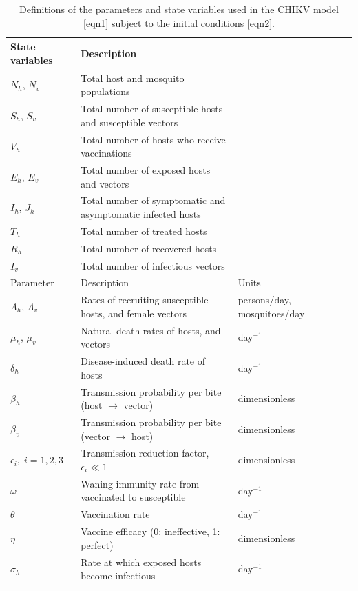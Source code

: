 \documentclass[9pt]{article}
\numberwithin{equation}{section}
\begin{document}
\begin{table}[!ht]
    \caption{Definitions of the parameters and state variables used in the CHIKV model \eqref{eqn1} subject to the initial conditions \eqref{eqn2}.}
    \label{table1}
    \begin{tabular}{lllll@{}}
        \toprule
        State variables& Description\\
        \midrule
        $N_h$, $N_v$ & Total host and mosquito populations \\
        $S_h$, $S_v$ & Total number of susceptible hosts and susceptible vectors \\
        $V_h$ & Total number of hosts who receive vaccinations \\
        $E_h$, $E_v$ & Total number of exposed hosts and vectors\\
        $I_h$, $J_h$ & Total number of symptomatic and asymptomatic infected hosts\\
        $T_h$ & Total number of treated hosts \\
        $R_h$ & Total number of recovered hosts \\
        $I_v$ & Total number of infectious vectors\\
        \midrule
        Parameter& Description& Units\\
        \midrule
        $\Lambda_h$, $\Lambda_v$ & Rates of recruiting susceptible hosts, and female vectors &persons/day, mosquitoes/day\\
        $\mu_h$, $\mu_v$ & Natural death rates of hosts, and vectors& day$^{-1}$\\
        $\delta_h$ & Disease-induced death rate of hosts & day$^{-1}$\\
        $\beta_h$ & Transmission probability per bite (host $\to$ vector)& dimensionless\\
        $\beta_v$ & Transmission probability per bite (vector $\to$ host)& dimensionless\\
        $\epsilon_i,\;i=1,2,3$ & Transmission reduction factor, $\epsilon_i\ll1$& dimensionless\\
        $\omega$ & Waning immunity rate from vaccinated to susceptible & day$^{-1}$\\
        $\theta$ & Vaccination rate & day$^{-1}$\\
        $\eta$ & Vaccine efficacy (0: ineffective, 1: perfect)& dimensionless\\
        $\sigma_h$ & Rate at which exposed hosts become infectious & day$^{-1}$\\

\end{tabular}
\end{table}
\end{document}
